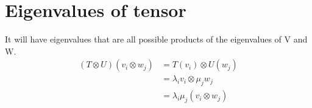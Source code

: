 \section{Eigenvalues of tensor}
It will have eigenvalues that are all possible products of the eigenvalues of V and W.
\begin{align*}
    (T \otimes U)(v_i \otimes w_j)
    &= T(v_i) \otimes U(w_j)\\
    &= \lambda_i v_i \otimes \mu_j w_j\\
    &= \lambda_i \mu_j (v_i \otimes w_j) \\
\end{align*}